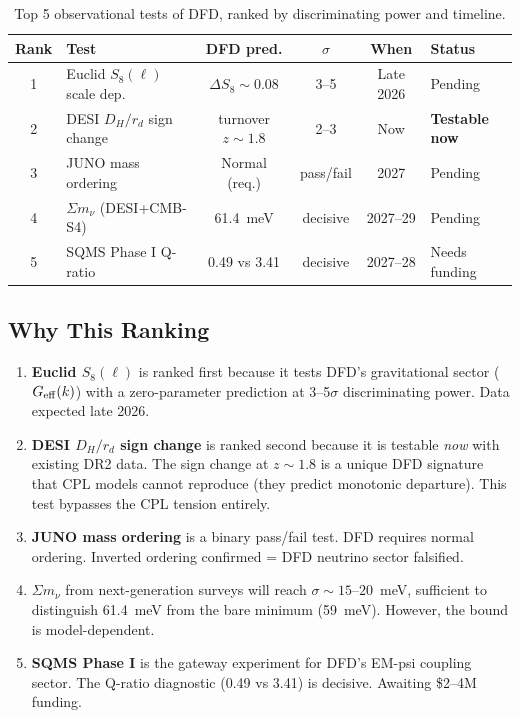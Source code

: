 \documentclass[11pt,a4paper]{article}
\begin{document}
\begin{table}[H]
\centering
\caption{Top 5 observational tests of DFD, ranked by discriminating
power and timeline.}
\label{tab:top5}
\small
\begin{tabular}{clcccl}
\toprule
\textbf{Rank} & \textbf{Test} & \textbf{DFD pred.} &
  \textbf{$\sigma$} & \textbf{When} & \textbf{Status} \\
\midrule
1 & Euclid $S_8(\ell)$ scale dep. & $\Delta S_8 \sim 0.08$ &
  3--5 & Late 2026 & Pending \\
2 & DESI $D_H/r_d$ sign change & turnover $z \sim 1.8$ &
  2--3 & Now & \textbf{Testable now} \\
3 & JUNO mass ordering & Normal (req.) &
  pass/fail & 2027 & Pending \\
4 & $\Sigma m_\nu$ (DESI+CMB-S4) & 61.4~meV &
  decisive & 2027--29 & Pending \\
5 & SQMS Phase I Q-ratio & 0.49 vs 3.41 &
  decisive & 2027--28 & Needs funding \\
\bottomrule
\end{tabular}
\end{table}

\subsection{Why This Ranking}

\begin{enumerate}
\item \textbf{Euclid $S_8(\ell)$} is ranked first because it tests
  DFD's gravitational sector ($G_{\rm eff}(k)$) with a zero-parameter
  prediction at 3--5$\sigma$ discriminating power. Data expected late
  2026.

\item \textbf{DESI $D_H/r_d$ sign change} is ranked second because it
  is testable \emph{now} with existing DR2 data. The sign change at
  $z \sim 1.8$ is a unique DFD signature that CPL models cannot
  reproduce (they predict monotonic departure). This test bypasses the
  CPL tension entirely.

\item \textbf{JUNO mass ordering} is a binary pass/fail test. DFD
  requires normal ordering. Inverted ordering confirmed = DFD neutrino
  sector falsified.

\item \textbf{$\Sigma m_\nu$} from next-generation surveys will reach
  $\sigma \sim 15$--$20$~meV, sufficient to distinguish 61.4~meV from
  the bare minimum (59~meV). However, the bound is model-dependent.

\item \textbf{SQMS Phase I} is the gateway experiment for DFD's EM-psi
  coupling sector. The Q-ratio diagnostic (0.49 vs 3.41) is decisive.
  Awaiting \$2--4M funding.
\end{enumerate}
\end{document}
